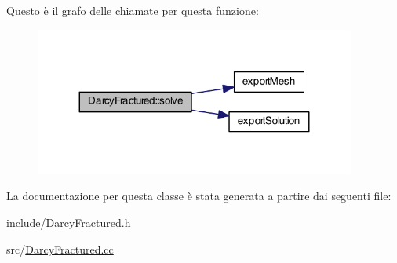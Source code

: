 Questo è il grafo delle chiamate per questa funzione\-:\nopagebreak
\begin{figure}[H]
\begin{center}
\leavevmode
\includegraphics[width=299pt]{classDarcyFractured_a074b6ec717f783c731b2be89f6528cc0_cgraph}
\end{center}
\end{figure}




La documentazione per questa classe è stata generata a partire dai seguenti file\-:\begin{DoxyCompactItemize}
\item 
include/\hyperlink{DarcyFractured_8h}{Darcy\-Fractured.\-h}\item 
src/\hyperlink{src_2DarcyFractured_8cc}{Darcy\-Fractured.\-cc}\end{DoxyCompactItemize}
